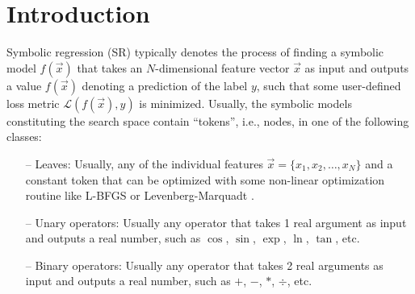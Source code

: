\documentclass[12pt]{iopart}
\begin{document}
\section{Introduction}
Symbolic regression (SR) typically denotes the process of finding a symbolic model $f\left(\vec{x}\right)$ that takes an $N$-dimensional feature vector $\vec{x}$ as input and outputs a value $f\left(\vec{x}\right)$ denoting a prediction of the label $y$, such that some user-defined loss metric $\mathcal{L}\left(f\left(\vec{x}\right),y\right)$ is minimized. Usually, the symbolic models constituting the search space contain ``tokens'', i.e., nodes, in one of the following classes:
\begin{itemize}
\item[--] Leaves: Usually, any of the individual features $\vec{x} = \{x_1, x_2, \ldots,x_{N}\}$ and a constant token that can be optimized with some non-linear optimization routine like L-BFGS \cite{doi:10.1137/0916069} or Levenberg-Marquadt \cite{83b09f23-b20e-3617-8f72-24765b713f7b} \cite{doi:10.1137/0111030}.
\item[--] Unary operators: Usually any operator that takes 1 real argument as input and outputs a real number, such as $\cos$, $\sin$, $\exp$, $\ln$, $\tan$, etc.
\item[--] Binary operators: Usually any operator that takes 2 real arguments as input and outputs a real number, such as $+$, $-$, $*$, $\div$, etc.
\end{itemize}
\end{document}
